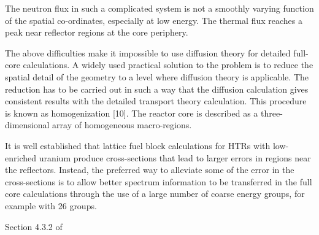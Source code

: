\documentclass[11pt,letterpaper]{article}
\begin{document}
The neutron flux in such a complicated system is not a smoothly varying function of the spatial co-ordinates, especially at low energy.
The thermal flux reaches a peak near reflector regions at the core periphery.

The above difficulties make it impossible to use diffusion theory for detailed full-core calculations.
A widely used practical solution to the problem is to reduce the spatial detail of the geometry to a level where diffusion theory is applicable. The reduction has to be carried out in such a way that the diffusion calculation gives consistent results with the detailed transport theory calculation.
This procedure is known as homogenization [10].
The reactor core is described as a three-dimensional array of homogeneous macro-regions.

\cite{leppanen_development_2007}


It is well established that lattice fuel block calculations for HTRs with low-enriched uranium produce cross-sections that lead to larger errors in regions near the reflectors.
Instead, the preferred way to alleviate some of the error in the cross-sections is to allow better spectrum information to be transferred in the full core calculations through the use of a large number of coarse energy groups, for example with 26 groups.
\cite{oecd_nea_coupled_2020}


Section 4.3.2 of \cite{leppanen_development_2007}



\pagebreak


\end{document}
